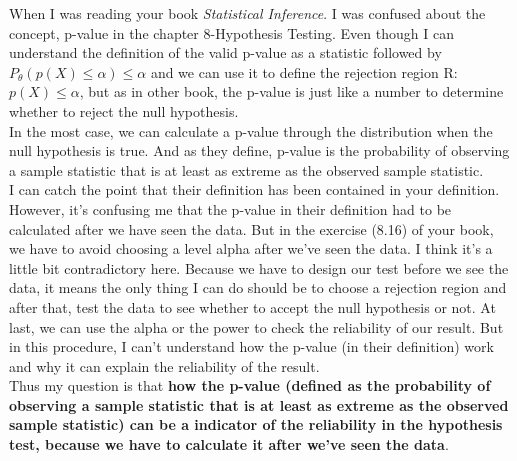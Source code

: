 \documentclass[11pt]{article}
\begin{document}
When I was reading your book \textit{Statistical Inference}. I was confused about the concept, p-value in the chapter 8-Hypothesis Testing.
Even though I can understand the definition of the valid p-value as a statistic followed by $P_{\theta}(p(X)\leq \alpha)\leq \alpha$ and we can use it to define the rejection region R: $p(X) \leq \alpha$, but as in other book, the p-value is just like a number to determine whether to reject the null hypothesis. \\


In the most case, we can calculate a p-value through the distribution when the null hypothesis is true. And as they define, p-value is the probability of observing a sample statistic that is at least as extreme as the observed sample statistic.\\


I can catch the point that their definition has been contained in your definition. However, it's confusing me that the p-value in their definition had to be calculated after we have seen the data. But in the exercise (8.16) of your book, we have to avoid choosing a level alpha after we've seen the data. I think it's a little bit contradictory here. Because we have to design our test before we see the data, it means the only thing I can do should be to choose a rejection region and after that, test the data to see whether to accept the null hypothesis or not. At last, we can use the alpha or the power to check the reliability of our result. But in this procedure, I can't understand how the p-value (in their definition) work and why it can explain the reliability of the result.\\

Thus my question is that \textbf{how the p-value (defined as the probability of observing a sample statistic that is at least as extreme as the observed sample statistic) can be a indicator of the reliability in the hypothesis test, because we have to calculate it after we've seen the data}.
\end{document}
